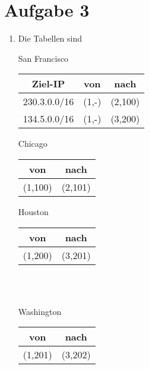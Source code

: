 \documentclass{article}
\begin{document}
	\section*{Aufgabe 3}
	\begin{enumerate}[label=(\alph*)]
		\item Die Tabellen sind \\
		\begin{minipage}[t]{0.3\textwidth}
			\begin{center}
				San Francisco \\
				\begin{tabular}{c|c|c}
					\textbf{Ziel-IP} & \textbf{von} & \textbf{nach} \\
					\hline
					230.3.0.0/16 & (1,-)  & (2,100) \\
					134.5.0.0/16 & (1,-) & (3,200)
				\end{tabular}
			\end{center}
		\end{minipage}
		\begin{minipage}[t]{0.3\textwidth}
			\begin{center}
				Chicago \\
				\begin{tabular}{c|c}
					\textbf{von} & \textbf{nach} \\
					\hline
					(1,100) & (2,101)
				\end{tabular}
			\end{center}
		\end{minipage}
		\begin{minipage}[t]{0.3\textwidth}
			\begin{center}
				Houston \\
				\begin{tabular}{c|c}
					\textbf{von} & \textbf{nach} \\
					\hline
					(1,200) & (3,201)
				\end{tabular}
			\end{center}
		\end{minipage} \\
		\vspace{0.2cm} \\
		\begin{minipage}[t]{0.45\textwidth}
			\begin{center}
				Washington \\
				\begin{tabular}{c|c}
					\textbf{von} & \textbf{nach} \\
					\hline
					(1,201) & (3,202)

\end{tabular}
\end{center}
\end{minipage}
\end{enumerate}
\end{document}
